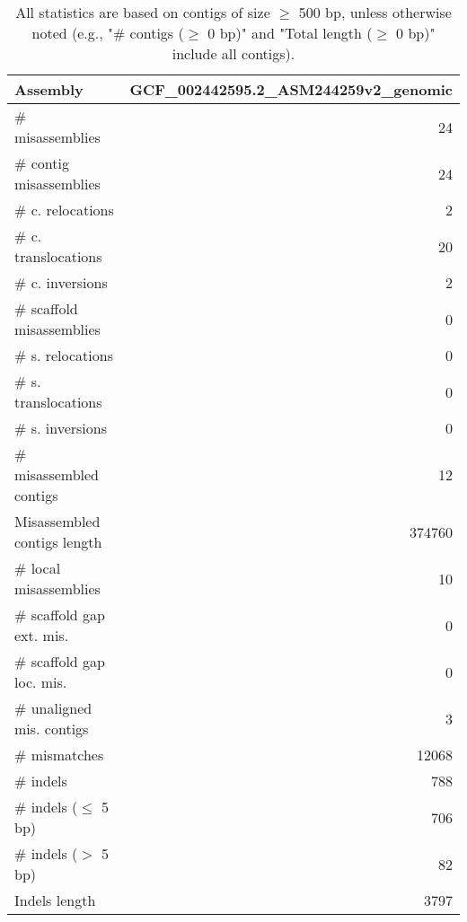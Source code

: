 \documentclass[12pt,a4paper]{article}
\begin{document}
\begin{table}[ht]
\begin{center}
\caption{All statistics are based on contigs of size $\geq$ 500 bp, unless otherwise noted (e.g., "\# contigs ($\geq$ 0 bp)" and "Total length ($\geq$ 0 bp)" include all contigs).}
\begin{tabular}{|l*{1}{|r}|}
\hline
Assembly & GCF\_002442595.2\_ASM244259v2\_genomic \\ \hline
\# misassemblies & 24 \\ \hline
\hspace{2mm}\# contig misassemblies & 24 \\ \hline
\hspace{5mm}\# c. relocations & 2 \\ \hline
\hspace{5mm}\# c. translocations & 20 \\ \hline
\hspace{5mm}\# c. inversions & 2 \\ \hline
\hspace{2mm}\# scaffold misassemblies & 0 \\ \hline
\hspace{5mm}\# s. relocations & 0 \\ \hline
\hspace{5mm}\# s. translocations & 0 \\ \hline
\hspace{5mm}\# s. inversions & 0 \\ \hline
\# misassembled contigs & 12 \\ \hline
Misassembled contigs length & 374760 \\ \hline
\# local misassemblies & 10 \\ \hline
\# scaffold gap ext. mis. & 0 \\ \hline
\# scaffold gap loc. mis. & 0 \\ \hline
\# unaligned mis. contigs & 3 \\ \hline
\# mismatches & 12068 \\ \hline
\# indels & 788 \\ \hline
\hspace{5mm}\# indels ($\leq$ 5 bp) & 706 \\ \hline
\hspace{5mm}\# indels ($>$ 5 bp) & 82 \\ \hline
Indels length & 3797 \\ \hline
\end{tabular}
\end{center}
\end{table}
\end{document}
